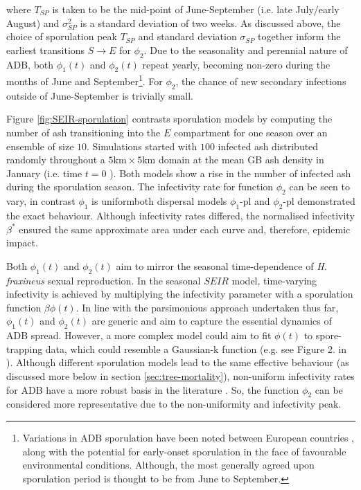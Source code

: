 where $T_{SP}$ is taken to be the mid-point of June-September (i.e. late July/early August) and $\sigma_{SP}^2$ is a standard deviation of two weeks.
As discussed above, the choice of sporulation peak $T_{SP}$ and standard deviation $\sigma_{SP}$ together inform the earliest transitions $S\rightarrow E$ for $\phi_2$.
Due to the seasonality and perennial nature of ADB, both $\phi_1(t)$ and $\phi_2(t)$ repeat yearly, becoming non-zero during the months of June and September\footnote{Variations in ADB sporulation have been noted between European countries \cite{https://doi.org/10.1111/mpp.12073}, along with the potential for early-onset sporulation in the face of favourable environmental conditions. Although, the most generally agreed upon sporulation period is thought to be from June to September.}.
For $\phi_2$, the chance of new secondary infections outside of June-September is trivially small.

Figure \ref{fig:SEIR-sporulation} contrasts sporulation models by computing the number of ash transitioning into the $E$ compartment for one season over an ensemble of size $10$.
Simulations started with $100$ infected ash distributed randomly throughout a $\mathrm{5km \times 5km}$ domain at the mean GB ash density in January (i.e. time $t=0$ ).
Both models show a rise in the number of infected ash during the sporulation season.
The infectivity rate for function $\phi_2$ can be seen to vary, in contrast $\phi_1$ is uniform\textemdash both dispersal models $\phi_1$-pl and $\phi_2$-pl demonstrated the exact behaviour.
Although infectivity rates differed, the normalised infectivity $\beta^*$ ensured the same approximate area under each curve and, therefore, epidemic impact.

Both $\phi_1(t)$ and $\phi_2(t)$ aim to mirror the seasonal time-dependence of \textit{H. fraxineus} sexual reproduction.
In the seasonal $SEIR$ model, time-varying infectivity is achieved by multiplying the infectivity parameter with a sporulation function $\beta\phi(t)$.
In line with the parsimonious approach undertaken thus far, $\phi_1(t)$ and $\phi_2(t)$ are generic and aim to capture the essential dynamics of ADB spread.
However, a more complex model could aim to fit $\phi(t)$ to spore-trapping data, which could resemble a Gaussian-k function (e.g. see Figure 2. in \cite{grosdidier2018tracking}).
Although different sporulation models lead to the same effective behaviour (as discussed more below in section \ref{sec:tree-mortality}), 
non-uniform infectivity rates for ADB have a more robust basis in the literature \cite{grosdidier2018tracking, time-varying-infectivity, hietala2013invasive, segarra2001epidemic}.
So, the function $\phi_2$ can be considered more representative due to the non-uniformity and infectivity peak.

